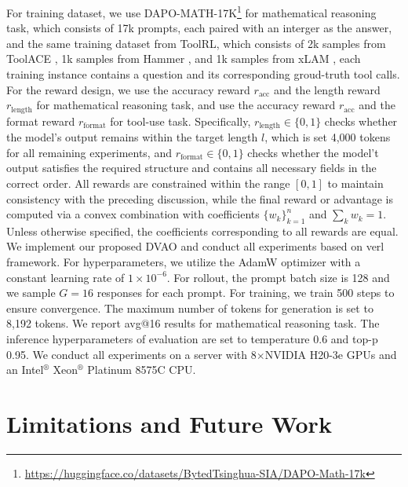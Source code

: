 For training dataset, we use DAPO-MATH-17K\footnote{\url{https://huggingface.co/datasets/BytedTsinghua-SIA/DAPO-Math-17k}} for mathematical reasoning task, which consists of 17k prompts, each paired with an interger as the answer, and the same training dataset from ToolRL, which consists of 2k samples from ToolACE \citep{toolace}, 1k samples from Hammer \citep{hammer}, and 1k samples from xLAM \citep{xlam}, each training instance contains a question and its corresponding groud-truth tool calls. For the reward design, we use the accuracy reward $r_\text{acc}$ and the length reward $r_\text{length}$ for mathematical reasoning task, and use the accuracy reward $r_\text{acc}$ and the format reward $r_\text{format}$ for tool-use task. Specifically, $r_\text{length} \in \{0, 1\}$ checks whether the model's output remains within the target length $l$, which is set 4,000 tokens for all remaining experiments, and $r_\text{format} \in \{0,1\}$ checks whether the model't output satisfies the required structure and contains all necessary fields in the correct order. All rewards are constrained within the range $[0,1]$ to maintain consistency with the preceding discussion, while the final reward or advantage is computed via a convex combination with coefficients $\{w_k\}_{k=1}^n$ and $\sum_k w_k = 1$. Unless otherwise specified, the coefficients corresponding to all rewards are equal. We implement our proposed DVAO and conduct all experiments based on verl \citep{verl} framework. For hyperparameters, we utilize the AdamW \citep{adamw} optimizer with a constant learning rate of $1 \times 10^{-6}$. For rollout, the prompt batch size is 128 and we sample $G=16$ responses for each prompt. For training, we train 500 steps to ensure convergence. The maximum number of tokens for generation is set to 8,192 tokens. We report avg@16 results for mathematical reasoning task. The inference hyperparameters of evaluation are set to temperature 0.6 and top-p 0.95. We conduct all experiments on a server with 8$\times$NVIDIA H20-3e GPUs and an Intel$^\text{®}$ Xeon$^\text{®}$ Platinum 8575C CPU.

\section{Limitations and Future Work}
\label{appendix:limitation}

